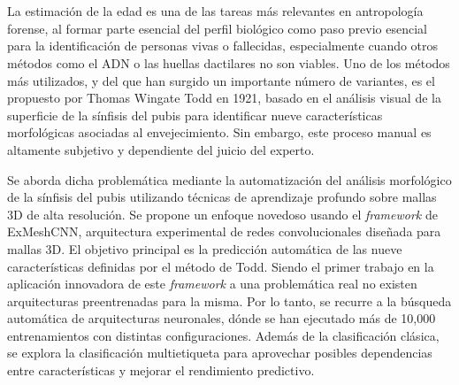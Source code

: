 \chapter*{}


%



\thispagestyle{empty}

\begin{center}
{\small \bfseries \myTitle}
\end{center}
\begin{center}
\myName
\end{center}



La estimación de la edad es una de las tareas más relevantes en antropología forense, al formar parte esencial del perfil biológico como paso previo esencial para la identificación de personas vivas o fallecidas, especialmente cuando otros métodos como el ADN o las huellas dactilares no son viables. Uno de los métodos más utilizados, y del que han surgido un importante número de variantes, es el propuesto por Thomas Wingate Todd en 1921, basado en el análisis visual de la superficie de la sínfisis del pubis para identificar nueve características morfológicas asociadas al envejecimiento. Sin embargo, este proceso manual es altamente subjetivo y dependiente del juicio del experto.

Se aborda dicha problemática mediante la automatización del análisis morfológico de la sínfisis del pubis utilizando técnicas de aprendizaje profundo sobre mallas 3D de alta resolución. Se propone un enfoque novedoso usando el \textit{framework} de ExMeshCNN, arquitectura experimental de redes convolucionales diseñada para mallas 3D. El objetivo principal es la predicción automática de las nueve características definidas por el método de Todd. Siendo el primer trabajo en la aplicación innovadora de este \textit{framework} a una problemática real no existen arquitecturas preentrenadas para la misma. Por lo tanto, se recurre a la búsqueda automática de arquitecturas neuronales, dónde se han ejecutado más de 10,000 entrenamientos con distintas configuraciones. Además de la clasificación clásica, se explora la clasificación multietiqueta para aprovechar posibles dependencias entre características y mejorar el rendimiento predictivo.

